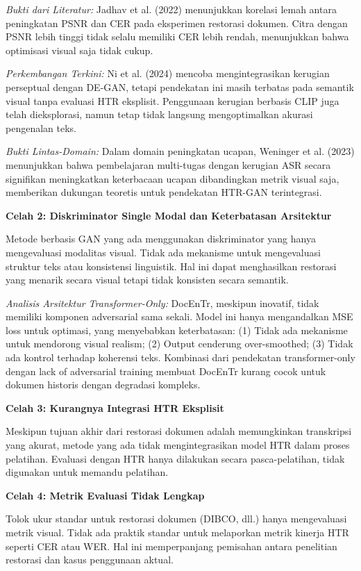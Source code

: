 \documentclass[12pt,a4paper]{article}
\begin{document}
\textit{Bukti dari Literatur:} Jadhav et al. (2022) menunjukkan korelasi lemah antara peningkatan PSNR dan CER pada eksperimen restorasi dokumen. Citra dengan PSNR lebih tinggi tidak selalu memiliki CER lebih rendah, menunjukkan bahwa optimisasi visual saja tidak cukup.

\textit{Perkembangan Terkini:} Ni et al. (2024) mencoba mengintegrasikan kerugian perseptual dengan DE-GAN, tetapi pendekatan ini masih terbatas pada semantik visual tanpa evaluasi HTR eksplisit. Penggunaan kerugian berbasis CLIP juga telah dieksplorasi, namun tetap tidak langsung mengoptimalkan akurasi pengenalan teks.

\textit{Bukti Lintas-Domain:} Dalam domain peningkatan ucapan, Weninger et al. (2023) menunjukkan bahwa pembelajaran multi-tugas dengan kerugian ASR secara signifikan meningkatkan keterbacaan ucapan dibandingkan metrik visual saja, memberikan dukungan teoretis untuk pendekatan HTR-GAN terintegrasi.

\textbf{Celah 2: Diskriminator Single Modal dan Keterbatasan Arsitektur}

Metode berbasis GAN yang ada menggunakan diskriminator yang hanya mengevaluasi modalitas visual. Tidak ada mekanisme untuk mengevaluasi struktur teks atau konsistensi linguistik. Hal ini dapat menghasilkan restorasi yang menarik secara visual tetapi tidak konsisten secara semantik.

\textit{Analisis Arsitektur Transformer-Only:} DocEnTr, meskipun inovatif, tidak memiliki komponen adversarial sama sekali. Model ini hanya mengandalkan MSE loss untuk optimasi, yang menyebabkan keterbatasan: (1) Tidak ada mekanisme untuk mendorong visual realism; (2) Output cenderung over-smoothed; (3) Tidak ada kontrol terhadap koherensi teks. Kombinasi dari pendekatan transformer-only dengan lack of adversarial training membuat DocEnTr kurang cocok untuk dokumen historis dengan degradasi kompleks.

\textbf{Celah 3: Kurangnya Integrasi HTR Eksplisit}

Meskipun tujuan akhir dari restorasi dokumen adalah memungkinkan transkripsi yang akurat, metode yang ada tidak mengintegrasikan model HTR dalam proses pelatihan. Evaluasi dengan HTR hanya dilakukan secara pasca-pelatihan, tidak digunakan untuk memandu pelatihan.

\textbf{Celah 4: Metrik Evaluasi Tidak Lengkap}

Tolok ukur standar untuk restorasi dokumen (DIBCO, dll.) hanya mengevaluasi metrik visual. Tidak ada praktik standar untuk melaporkan metrik kinerja HTR seperti CER atau WER. Hal ini memperpanjang pemisahan antara penelitian restorasi dan kasus penggunaan aktual.
\end{document}
